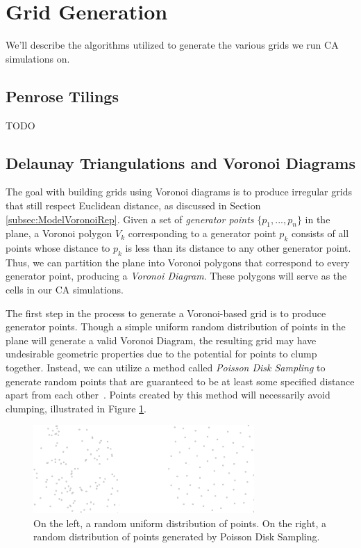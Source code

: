 \documentclass[a4paper,11pt]{report}
\begin{document}
\section{Grid Generation}
\label{sec:GridGen}

We'll describe the algorithms utilized to generate the various grids we run CA simulations on.

\subsection{Penrose Tilings}
TODO

\subsection{Delaunay Triangulations and Voronoi Diagrams}
The goal with building grids using Voronoi diagrams is to produce irregular grids that still respect Euclidean distance, as discussed in Section \ref{subsec:ModelVoronoiRep}. Given a set of \textit{generator points} $\{p_1, ..., p_n\}$ in the plane, a Voronoi polygon $V_k$ corresponding to a generator point $p_k$ consists of all points whose distance to $p_k$ is less than its distance to any other generator point. Thus, we can partition the plane into Voronoi polygons that correspond to every generator point, producing a \textit{Voronoi Diagram}. These polygons will serve as the cells in our CA simulations. 

The first step in the process to generate a Voronoi-based grid is to produce generator points. Though a simple uniform random distribution of points in the plane will generate a valid Voronoi Diagram, the resulting grid may have undesirable geometric properties due to the potential for points to clump together. Instead, we can utilize a method called \textit{Poisson Disk Sampling} to generate random points that are guaranteed to be at least some specified distance apart from each other~\cite{br07}. Points created by this method will necessarily avoid clumping, illustrated in Figure \ref{fig:pt_gen}.

\begin{figure}[htp]
\centering
\includegraphics[width=0.75\textwidth]{gen_pts}
\caption[Random Point Generation]{
	On the left, a random uniform distribution of points. On the right, a random distribution of points generated by Poisson Disk Sampling.
}
\label{fig:pt_gen}
\end{figure}
\end{document}
